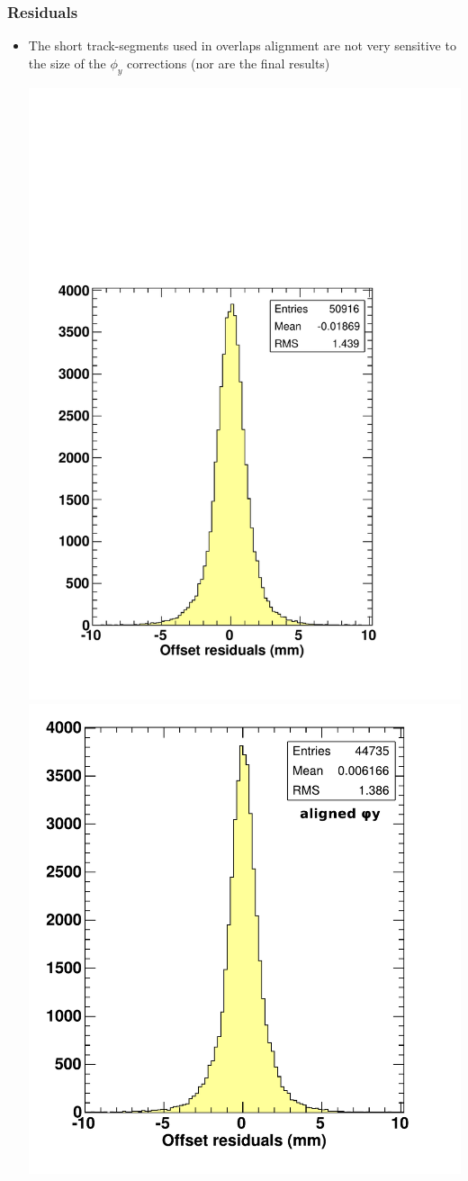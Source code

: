 \documentclass[compress]{beamer}
\begin{document}
\begin{frame}
\frametitle{Residuals}
\begin{itemize}
\item The short track-segments used in overlaps alignment are not very
  sensitive to the size of the $\phi_y$ corrections (nor are the
  final results)

\begin{center}
\includegraphics[width=0.5\linewidth]{offsetResiduals_badphiy.pdf}
\includegraphics[width=0.5\linewidth]{offsetResiduals_goodphiy.pdf}
\end{center}
\end{itemize}
\end{frame}
\end{document}
